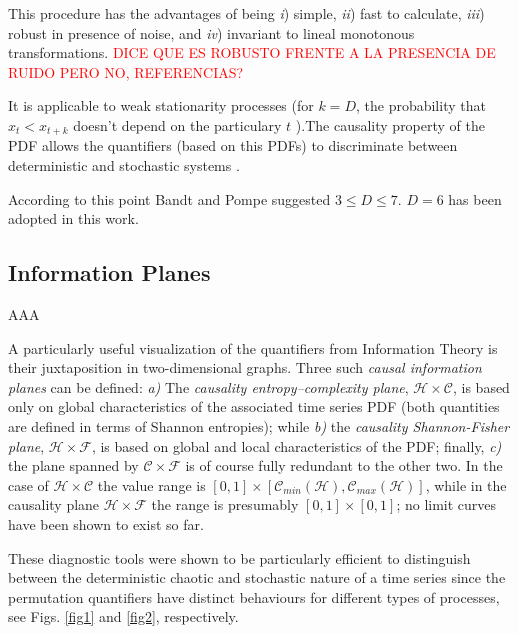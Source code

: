 This procedure has the advantages of being {\it i}) simple, {\it ii}) fast to calculate, {\it iii}) robust in presence of noise, and {\it iv}) invariant to lineal monotonous transformations. \textcolor{red}{DICE QUE ES ROBUSTO FRENTE A LA PRESENCIA DE RUIDO PERO NO, REFERENCIAS?}

It is applicable to weak stationarity processes (for $k=D$, the probability that $x_t < x_{t+k}$ doesn't depend on the particulary $t$ \cite{Bandt2002}).The causality property of the PDF allows the quantifiers (based on this PDFs) to discriminate between deterministic and stochastic systems \cite{Rosso2007B}.

According to this point Bandt and Pompe suggested $3\leq D \leq 7$. $D=6$ has been adopted in this work.

\subsection{Information Planes}

AAA

A particularly useful visualization of the quantifiers from Information Theory is their juxtaposition in two-dimensional graphs. Three  such \textit{causal information planes} can be defined: 
{\it a)\/} The {\it causality entropy--complexity plane\/}, ${\mathcal H} \times {\mathcal C}$, is based 
only on global characteristics of the associated time series PDF (both quantities are defined in terms of 
Shannon entropies); while 
{\it b)\/} the {\it causality Shannon-Fisher plane\/}, ${\mathcal H} \times {\mathcal F}$, is based on 
global and local characteristics of the PDF; finally, {\it c)\/} the plane spanned by ${\mathcal C} \times {\mathcal F}$ is of course fully redundant to the other two.  
In the case of ${\mathcal H} \times {\mathcal C}$ the value range is $[0, 1] \times [{\mathcal C}_{min}(\mathcal{H}), 
{\mathcal C}_{max}(\mathcal{H})]$, while in the causality 
plane ${\mathcal H} \times {\mathcal F}$ the range is presumably $[0, 1]\times [0, 1]$; no limit curves have been shown to exist so far.

These diagnostic tools were shown to be particularly efficient to distinguish between the deterministic chaotic and stochastic nature of a time series since the permutation quantifiers have distinct behaviours for different types of processes, see Figs. \ref{fig1} and \ref{fig2}, respectively. 

